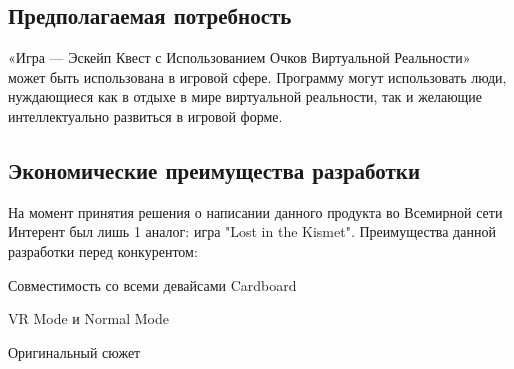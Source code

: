 \subsection{Предполагаемая потребность}
«Игра — Эскейп Квест с Использованием Очков Виртуальной Реальности» может быть использована в игровой сфере. Программу могут использовать люди, нуждающиеся как в отдыхе в мире виртуальной реальности, так и желающие интеллектуально развиться в игровой форме.
\subsection{Экономические преимущества разработки}
На момент принятия решения о написании данного продукта во Всемирной сети Интерент был лишь 1 аналог: игра "Lost in the Kismet".
Преимущества данной разработки перед конкурентом:
\begin{my_enumerate}
\item Совместимость со всеми девайсами Cardboard
\item VR Mode и Normal Mode
\item Оригинальный сюжет
\end{my_enumerate}